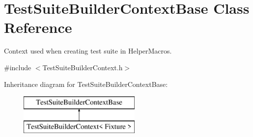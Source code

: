 \hypertarget{class_test_suite_builder_context_base}{}\section{Test\+Suite\+Builder\+Context\+Base Class Reference}
\label{class_test_suite_builder_context_base}


Context used when creating test suite in Helper\+Macros.  




{\ttfamily \#include $<$Test\+Suite\+Builder\+Context.\+h$>$}

Inheritance diagram for Test\+Suite\+Builder\+Context\+Base\+:\begin{figure}[H]
\begin{center}
\leavevmode
\includegraphics[height=2.000000cm]{class_test_suite_builder_context_base}
\end{center}
\end{figure}
